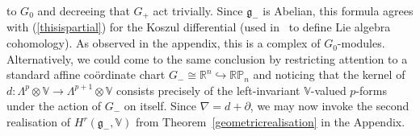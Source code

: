 \documentclass[11pt]{article}
\begin{document}
to $G_0$ and decreeing that $G_+$ act trivially. Since ${\mathfrak{g}}_-$ is
Abelian, this formula agrees with (\ref{thisispartial}) for the Koszul
dif\/ferential (used in~\cite{ce} to def\/ine Lie algebra cohomology). As observed
in the appendix, this is a complex of $G_0$-modules. Alternatively, we could
come to the same conclusion by restricting attention to a standard af\/f\/ine
co\"ordinate chart $G_-\cong{\mathbb{R}}^n\hookrightarrow{\mathbb{RP}}_n$ and
noticing that the kernel of
$d:\Lambda^p\otimes{\mathbb{V}}\to\Lambda^{p+1}\otimes{\mathbb{V}}$ consists
precisely of the left-invariant ${\mathbb{V}}$-valued $p$-forms under the
action of $G_-$ on itself. Since $\nabla=d+\partial$, we may now invoke the
second realisation of $H^r({\mathfrak{g}}_-,{\mathbb{V}})$ from
Theorem~\ref{geometricrealisation} in the Appendix.
\end{document}
